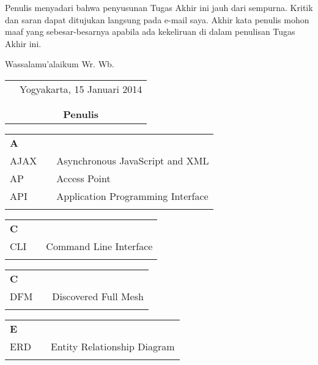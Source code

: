 \documentclass{TMUIITA}
\begin{document}
Penulis menyadari bahwa penyusunan Tugas Akhir ini jauh dari sempurna. Kritik dan saran dapat ditujukan langsung pada e-mail saya. Akhir kata penulis mohon maaf yang sebesar-besarnya apabila ada kekeliruan di dalam penulisan Tugas Akhir ini.

\vspace{0.5cm}

Wassalamu'alaikum Wr. Wb.

\begin{tabular}{p{7.5cm}c}
&Yogyakarta, 15 Januari 2014\\
&\\
&\\
&\textbf{Penulis}
\end{tabular}

\tableofcontents
{}
\listoftables
{}
\listoffigures
{}

\singkatan
\noindent

\begin{tabular}{p{20pt}p{3pt}l}
\textbf{A}\\
AJAX & & Asynchronous JavaScript and XML\\
AP & & Access Point\\
API & & Application Programming Interface\\
\\
\end{tabular}

\begin{tabular}{p{20pt}p{3pt}l}
\textbf{C}\\
CLI & & Command Line Interface\\
\\
\end{tabular}

\begin{tabular}{p{20pt}p{3pt}l}
\textbf{C}\\
DFM & & Discovered Full Mesh\\
\\
\end{tabular}

\begin{tabular}{p{20pt}p{3pt}l}
\textbf{E}\\
ERD & & Entity Relationship Diagram\\
\\
\end{tabular}
\end{document}
